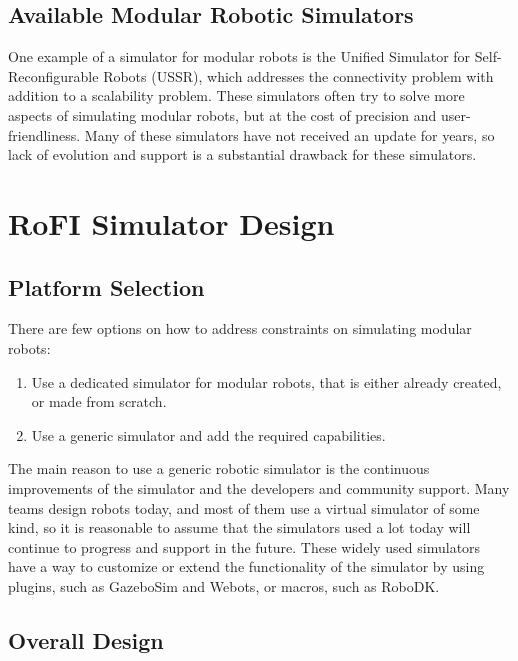 \documentclass[
  digital, %
  table,   %
  oneside, %
  nolof,     %
  nolot,     %
]{fithesis3}
\begin{document}
\section{Available Modular Robotic Simulators}

One example of a simulator for modular robots is the Unified Simulator for Self-Reconfigurable Robots (USSR)\cite{ussr}, which addresses
the connectivity problem with addition to a scalability problem.
These simulators often try to solve more aspects of simulating modular robots, but at the cost of precision and user-friendliness.
Many of these simulators have not received an update for years, so lack of evolution and support is a substantial drawback for these simulators.


\chapter{RoFI Simulator Design}

\section{Platform Selection}

There are few options on how to address constraints on simulating modular robots:
\begin{enumerate}
    \item Use a dedicated simulator for modular robots, that is either already created, or made from scratch.
    \item Use a generic simulator and add the required capabilities.
\end{enumerate}

The main reason to use a generic robotic simulator is the continuous improvements of the simulator and the developers and community support.
Many teams design robots today, and most of them use a virtual simulator of some kind, so it is reasonable to assume that the simulators used a lot today will continue to progress and support in the future.
These widely used simulators have a way to customize or extend the functionality of the simulator by using plugins, such as GazeboSim\cite{gazebo} and Webots\cite{webots}, or macros, such as RoboDK\cite{robodk}.


\section{Overall Design}
\end{document}
